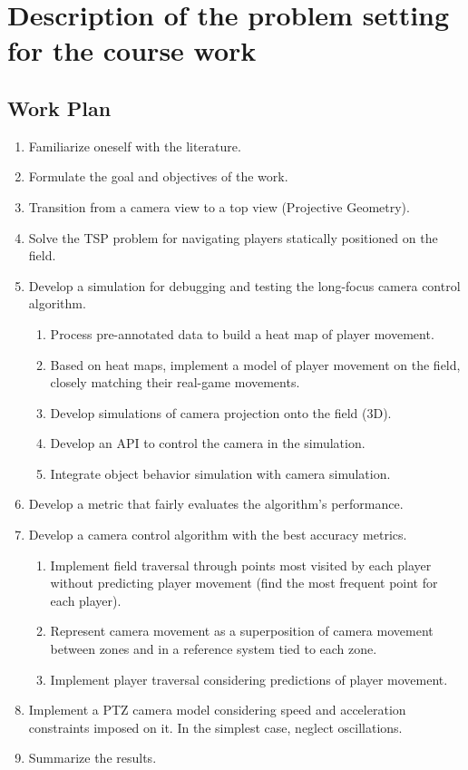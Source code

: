 \chapter{Description of the problem setting for the course work}
\label{cha:Osnovania-ENG}


\section{Work Plan}

\begin{enumerate}
    \item Familiarize oneself with the literature.
    \item Formulate the goal and objectives of the work.
    \item Transition from a camera view to a top view (Projective Geometry).
    \item Solve the TSP problem for navigating players statically positioned on the field.
    \item Develop a simulation for debugging and testing the long-focus camera control algorithm.
    \begin{enumerate}
        \item Process pre-annotated data to build a heat map of player movement.
        \item Based on heat maps, implement a model of player movement on the field, closely matching their real-game movements.
        \item Develop simulations of camera projection onto the field (3D).
        \item Develop an API to control the camera in the simulation.
        \item Integrate object behavior simulation with camera simulation.
    \end{enumerate}
    \item Develop a metric that fairly evaluates the algorithm's performance.
    \item Develop a camera control algorithm with the best accuracy metrics.
    \begin{enumerate}
        \item Implement field traversal through points most visited by each player without predicting player movement (find the most frequent point for each player).
        \item Represent camera movement as a superposition of camera movement between zones and in a reference system tied to each zone.
        \item Implement player traversal considering predictions of player movement.
    \end{enumerate}
    \item Implement a PTZ camera model considering speed and acceleration constraints imposed on it. In the simplest case, neglect oscillations.
    \item Summarize the results.
\end{enumerate}

